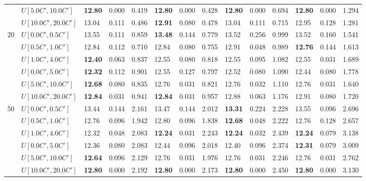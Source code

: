 \begin{table}[h]
{\begin{tabular}{|l|l||l|l|l||l|l|l||l|l|l||l|l|l|}
       & $U[5.0C',10.0C']$ & \textbf{12.80} & 0.000 & 0.419 & \textbf{12.80} & 0.000 & 0.428 & \textbf{12.80} & 0.000 & 0.694 & \textbf{12.80} & 0.000 & 1.294 \\
       & $U[10.0C',20.0C']$ & 13.04 & 0.111 & 0.486 & \textbf{12.91} & 0.080 & 0.478 & 13.04 & 0.111 & 0.715 & 12.95 & 0.128 & 1.281 \\
      \hline\hline
      \multirow{6}{*}{20} & $U[0.0C',0.5C']$ & 13.55 & 0.111 & 0.859 & \textbf{13.48} & 0.144 & 0.779 & 13.52 & 0.256 & 0.999 & 13.52 & 0.160 & 1.541 \\
       & $U[0.5C',1.0C']$ & 12.84 & 0.112 & 0.710 & 12.84 & 0.080 & 0.755 & 12.91 & 0.048 & 0.989 & \textbf{12.76} & 0.144 & 1.613 \\
       & $U[1.0C',4.0C']$ & \textbf{12.40} & 0.063 & 0.837 & 12.55 & 0.080 & 0.818 & 12.55 & 0.095 & 1.082 & 12.55 & 0.031 & 1.689 \\
       & $U[0.0C',5.0C']$ & \textbf{12.32} & 0.112 & 0.901 & 12.55 & 0.127 & 0.797 & 12.52 & 0.080 & 1.090 & 12.44 & 0.080 & 1.778 \\
       & $U[5.0C',10.0C']$ & \textbf{12.68} & 0.080 & 0.835 & 12.76 & 0.031 & 0.821 & 12.76 & 0.032 & 1.110 & 12.76 & 0.031 & 1.640 \\
       & $U[10.0C',20.0C']$ & \textbf{12.84} & 0.031 & 0.941 & \textbf{12.84} & 0.031 & 0.957 & 12.88 & 0.063 & 1.176 & 12.91 & 0.080 & 1.720 \\
      \hline\hline
      \multirow{6}{*}{50} & $U[0.0C',0.5C']$ & 13.44 & 0.144 & 2.161 & 13.47 & 0.144 & 2.012 & \textbf{13.31} & 0.224 & 2.228 & 13.55 & 0.096 & 2.696 \\
       & $U[0.5C',1.0C']$ & 12.76 & 0.096 & 1.942 & 12.80 & 0.096 & 1.838 & \textbf{12.68} & 0.048 & 2.222 & 12.76 & 0.128 & 2.657 \\
       & $U[1.0C',4.0C']$ & 12.32 & 0.048 & 2.083 & \textbf{12.24} & 0.031 & 2.243 & \textbf{12.24} & 0.032 & 2.439 & \textbf{12.24} & 0.079 & 3.138 \\
       & $U[0.0C',5.0C']$ & 12.36 & 0.080 & 2.083 & 12.44 & 0.096 & 2.018 & 12.40 & 0.096 & 2.374 & \textbf{12.31} & 0.079 & 3.009 \\
       & $U[5.0C',10.0C']$ & \textbf{12.64} & 0.096 & 2.129 & 12.76 & 0.031 & 1.976 & 12.76 & 0.031 & 2.246 & 12.76 & 0.031 & 2.762 \\
       & $U[10.0C',20.0C']$ & \textbf{12.80} & 0.000 & 2.192 & \textbf{12.80} & 0.000 & 2.173 & \textbf{12.80} & 0.000 & 2.450 & \textbf{12.80} & 0.000 & 3.130 \\
      \hline
      \end{tabular}
      }
      \label{tab:pcpn90p8}\end{table}


